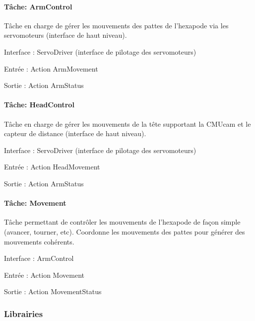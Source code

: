 \paragraph*{Tâche\-: Arm\-Control}

Tâche en charge de gérer les mouvements des pattes de l'hexapode via les servomoteurs (interface de haut niveau).


\begin{DoxyItemize}
\item Interface \-: Servo\-Driver (interface de pilotage des servomoteurs)
\item Entrée \-: Action Arm\-Movement
\item Sortie \-: Action Arm\-Status
\end{DoxyItemize}

\paragraph*{Tâche\-: Head\-Control}

Tâche en charge de gérer les mouvements de la tête supportant la C\-M\-Ucam et le capteur de distance (interface de haut niveau).


\begin{DoxyItemize}
\item Interface \-: Servo\-Driver (interface de pilotage des servomoteurs)
\item Entrée \-: Action Head\-Movement
\item Sortie \-: Action Arm\-Status
\end{DoxyItemize}

\paragraph*{Tâche\-: Movement}

Tâche permettant de contrôler les mouvements de l'hexapode de façon simple (avancer, tourner, etc). Coordonne les mouvements des pattes pour générer des mouvements cohérents.


\begin{DoxyItemize}
\item Interface \-: Arm\-Control
\item Entrée \-: Action Movement
\item Sortie \-: Action Movement\-Status
\end{DoxyItemize}

\subsubsection*{Librairies}

